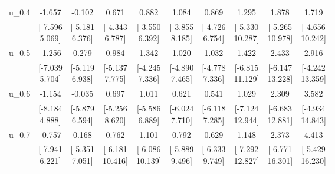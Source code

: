 {\begin{tabular}{lccccccccc}
u\_0.4 & -1.657 & -0.102 & 0.671 & 0.882 & 1.084 & 0.869 & 1.295 & 1.878 & 1.719 \\
 & \shortstack{[-7.596\\5.069]} & \shortstack{[-5.181\\6.376]} & \shortstack{[-4.343\\6.787]} & \shortstack{[-3.550\\6.392]} & \shortstack{[-3.855\\8.185]} & \shortstack{[-4.726\\6.754]} & \shortstack{[-5.330\\10.287]} & \shortstack{[-5.265\\10.978]} & \shortstack{[-4.656\\10.242]} \\[0.25em]
u\_0.5 & -1.256 & 0.279 & 0.984 & 1.342 & 1.020 & 1.032 & 1.422 & 2.433 & 2.916 \\
 & \shortstack{[-7.039\\5.704]} & \shortstack{[-5.119\\6.938]} & \shortstack{[-5.137\\7.775]} & \shortstack{[-4.245\\7.336]} & \shortstack{[-4.890\\7.465]} & \shortstack{[-4.778\\7.336]} & \shortstack{[-6.815\\11.129]} & \shortstack{[-6.147\\13.228]} & \shortstack{[-4.242\\13.359]} \\[0.25em]
u\_0.6 & -1.154 & -0.035 & 0.697 & 1.011 & 0.621 & 0.541 & 1.029 & 2.309 & 3.582 \\
 & \shortstack{[-8.184\\4.888]} & \shortstack{[-5.879\\6.594]} & \shortstack{[-5.256\\8.620]} & \shortstack{[-5.586\\6.889]} & \shortstack{[-6.024\\7.710]} & \shortstack{[-6.118\\7.285]} & \shortstack{[-7.124\\12.944]} & \shortstack{[-6.683\\12.881]} & \shortstack{[-4.934\\14.843]} \\[0.25em]
u\_0.7 & -0.757 & 0.168 & 0.762 & 1.101 & 0.792 & 0.629 & 1.148 & 2.373 & 4.413 \\
 & \shortstack{[-7.941\\6.221]} & \shortstack{[-5.351\\7.051]} & \shortstack{[-6.181\\10.416]} & \shortstack{[-6.086\\10.139]} & \shortstack{[-5.889\\9.496]} & \shortstack{[-6.333\\9.749]} & \shortstack{[-7.292\\12.827]} & \shortstack{[-6.771\\16.301]} & \shortstack{[-5.429\\16.230]} \\[0.25em]

\end{tabular}}
